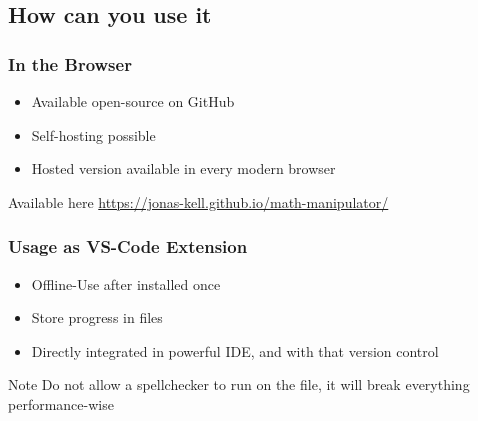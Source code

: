     \subsection{How can you use it}
        \begin{frame}
            \frametitle{In the Browser}

            \begin{itemize}
                \item Available open-source on GitHub
                \item Self-hosting possible
                \item Hosted version available in every modern browser
            \end{itemize}

            \vspace{1em}

            \begin{block}{Available here}
                \href{https://jonas-kell.github.io/math-manipulator/}{https://jonas-kell.github.io/math-manipulator/}
            \end{block}
        \end{frame}
    
    
        \begin{frame}
            \frametitle{Usage as VS-Code Extension}

            \begin{itemize}
                \item Offline-Use after installed once
                \item Store progress in files
                \item Directly integrated in powerful IDE, and with that version control
            \end{itemize}

            \vspace{1em}

            \begin{alertblock}{Note}
                Do not allow a spellchecker to run on the file, it will break everything performance-wise
            \end{alertblock}

        \end{frame}


